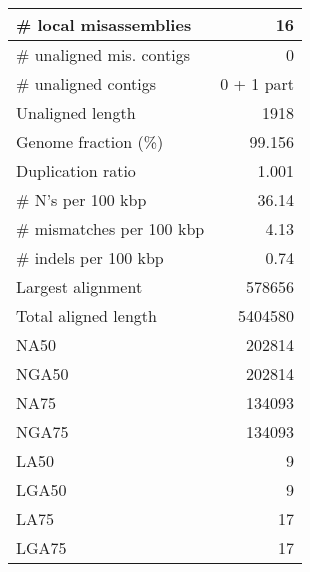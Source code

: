 \documentclass[12pt,a4paper]{article}
\begin{document}
\begin{table}[ht]
\begin{center}
\begin{tabular}{|l*{1}{|r}|}
\# local misassemblies & 16 \\ \hline
\# unaligned mis. contigs & 0 \\ \hline
\# unaligned contigs & 0 + 1 part \\ \hline
Unaligned length & 1918 \\ \hline
Genome fraction (\%) & 99.156 \\ \hline
Duplication ratio & 1.001 \\ \hline
\# N's per 100 kbp & 36.14 \\ \hline
\# mismatches per 100 kbp & 4.13 \\ \hline
\# indels per 100 kbp & 0.74 \\ \hline
Largest alignment & 578656 \\ \hline
Total aligned length & 5404580 \\ \hline
NA50 & 202814 \\ \hline
NGA50 & 202814 \\ \hline
NA75 & 134093 \\ \hline
NGA75 & 134093 \\ \hline
LA50 & 9 \\ \hline
LGA50 & 9 \\ \hline
LA75 & 17 \\ \hline
LGA75 & 17 \\ \hline
\end{tabular}
\end{center}
\end{table}
\end{document}
